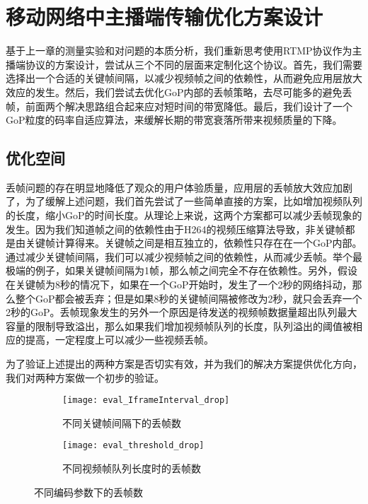 \chapter{移动网络中主播端传输优化方案设计}

基于上一章的测量实验和对问题的本质分析，我们重新思考使用RTMP协议作为主播端协议的方案设计，尝试从三个不同的层面来定制化这个协议。首先，我们需要选择出一个合适的关键帧间隔，以减少视频帧之间的依赖性，从而避免应用层放大效应的发生。然后，我们尝试去优化GoP内部的丢帧策略，去尽可能多的避免丢帧，前面两个解决思路组合起来应对短时间的带宽降低。最后，我们设计了一个GoP粒度的码率自适应算法，来缓解长期的带宽衰落所带来视频质量的下降。

\section{优化空间}
\label{sec:design_space}

丢帧问题的存在明显地降低了观众的用户体验质量，应用层的丢帧放大效应加剧了，为了缓解上述问题，我们首先尝试了一些简单直接的方案，比如增加视频队列的长度，缩小GoP的时间长度。从理论上来说，这两个方案都可以减少丢帧现象的发生。因为我们知道帧之间的依赖性由于H264的视频压缩算法导致，非关键帧都是由关键帧计算得来。关键帧之间是相互独立的，依赖性只存在在一个GoP内部。通过减少关键帧间隔，我们可以减少视频帧之间的依赖性，从而减少丢帧。举个最极端的例子，如果关键帧间隔为1帧，那么帧之间完全不存在依赖性。另外，假设在关键帧为8秒的情况下，如果在一个GoP开始时，发生了一个2秒的网络抖动，那么整个GoP都会被丢弃；但是如果8秒的关键帧间隔被修改为2秒，就只会丢弃一个2秒的GoP。丢帧现象发生的另外一个原因是待发送的视频帧数据量超出队列最大容量的限制导致溢出，那么如果我们增加视频帧队列的长度，队列溢出的阈值被相应的提高，一定程度上可以减少一些视频丢帧。

为了验证上述提出的两种方案是否切实有效，并为我们的解决方案提供优化方向，我们对两种方案做一个初步的验证。

\begin{figure}[h]%
  \centering
  \begin{subfigure}{0.49\textwidth}
      \texttt{[image: eval\_IframeInterval\_drop]}
      \caption{不同关键帧间隔下的丢帧数}
      \label{fig:keyframe_drop}
  \end{subfigure}
  \hfill
  \begin{subfigure}{0.49\textwidth}
      \texttt{[image: eval\_threshold\_drop]}
      \caption{不同视频帧队列长度时的丢帧数}
      \label{fig:threshold_drop}
  \end{subfigure}
  \vspace{0.1in}
  \caption{不同编码参数下的丢帧数}
  \label{fig:prelimary_drop}
\end{figure}

